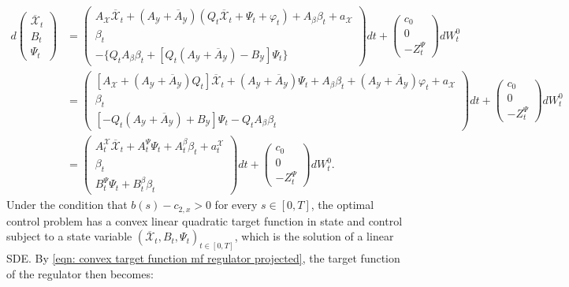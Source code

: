 \documentclass[11pt,twoside]{amsart}
\theoremstyle{definition}
\numberwithin{equation}{section}
\renewcommand{\bar}{\overline}
\begin{document}
\begin{align*}
    d 
    \begin{pmatrix} 
    \bar{\mathcal{X}}_t\\
    B_t\\
    \Psi_t 
    \end{pmatrix} 
    &= \begin{pmatrix} 
    A_\mathcal{X} \bar{\mathcal{X}}_t + (A_\mathcal{Y} + \bar{A}_{\mathcal{Y}} ) (Q_t \bar{\mathcal{X}}_t + \Psi_t + \varphi_t) + A_\beta \beta_t + a_\mathcal{X} \\
    \beta_t\\ 
    - \{ Q_t A_\beta \beta_t + [Q_t( A_\mathcal{Y} + \bar{A}_{\mathcal{Y}})- B_\mathcal{Y}]\Psi_t \} 
    \end{pmatrix} dt + \begin{pmatrix}c_0 \\0\\ -Z^\Psi_t\end{pmatrix}dW^0_t\\
  &= \begin{pmatrix} 
    [A_\mathcal{X} + (A_\mathcal{Y} + \bar{A}_{\mathcal{Y}}) Q_t ] \bar{\mathcal{X}}_t + (A_\mathcal{Y} + \bar{A}_{\mathcal{Y}} )\Psi_t + A_\beta \beta_t + (A_\mathcal{Y} + \bar{A}_{\mathcal{Y}} )\varphi_t + a_\mathcal{X} \\
    \beta_t\\
     [-Q_t( A_\mathcal{Y} + \bar{A}_{\mathcal{Y}})+ B_\mathcal{Y}]\Psi_t - Q_t A_\beta \beta_t  
    \end{pmatrix} dt + \begin{pmatrix}c_0 \\0\\- Z^\Psi_t \end{pmatrix}dW^0_t\\\nonumber
    & = \begin{pmatrix} 
    A^{\mathcal{X}}_t \bar{\mathcal{X}}_t + A^{\Psi}_t\Psi_t + A^\beta_t \beta_t + a^\mathcal{X}_t \\
    \beta_t\\
     B^{\Psi}_t\Psi_t + B^{\beta}_t \beta_t  
    \end{pmatrix} dt + \begin{pmatrix}c_0 \\ 0 \\ -Z^\Psi_t \end{pmatrix}dW^0_t.
\end{align*}
Under the condition that $b(s) - c_{2,x}>0$ for every $s\in[0,T]$, the optimal control problem has a convex linear quadratic target function in state and control subject to a state variable $(\bar{\mathcal{X}}_t,B_t, \Psi_t)_{t\in[0,T]}$, which is the solution of a linear SDE. By \eqref{eqn: convex target function mf regulator projected}, the target function of the regulator then becomes: 
\end{document}
